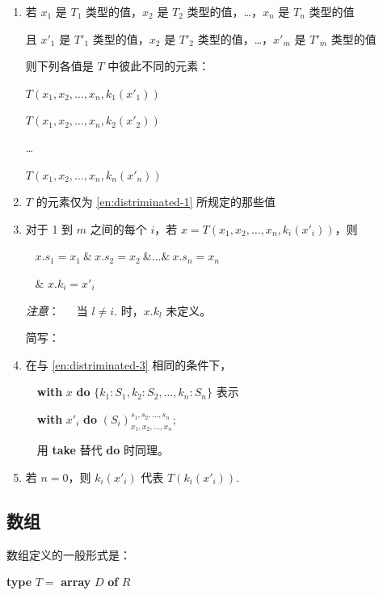 \begin{enumerate}[wide, nosep, label=(\arabic*)]
	\item \label{en:distriminated-1}
	若 $x_1$ 是 $T_1$ 类型的值，$x_2$ 是 $T_2$ 类型的值，\dots，$x_n$ 是 $T_n$ 类型的值
	
	且 $x'_1$ 是 $T'_1$ 类型的值，$x_2$ 是 $T'_2$ 类型的值，\dots，$x'_m$ 是 $T'_m$ 类型的值
	
	则下列各值是 $T$ 中彼此不同的元素：
	
	$T(x_1, x_2, \dots, x_n, k_1(x'_1))$
	
	$T(x_1, x_2, \dots, x_n, k_2(x'_2))$
	
	\quad \dots
	
	$T(x_1, x_2, \dots, x_n, k_n(x'_n))$

	\item $T$ 的元素仅为 \ref{en:distriminated-1} 所规定的那些值
	
	\item\label{en:distriminated-3}
	对于 1 到 $m$ 之间的每个 $i$，若 $x = T(x_1, x_2, \dots, x_n, k_i(x'_i))$，则
	
	\qquad~ $x.s_1 = x_1\ \&\ x.s_2 = x_2\ \& \dots \&\ x.s_n = x_n$
	
	\quad~ \& $x.k_i = x'_i$

	\noindent
	\textit{注意}：\quad~~\, 当 $l \neq i.$ 时，$x.k_l$ 未定义。
	
	\noindent
	简写：
	
	\item 在与 \ref{en:distriminated-3} 相同的条件下，
	
	\quad~\, \textbf{with} $x$ \textbf{do} $\{k_1:S_1, k_2:S_2, \dots, k_n:S_n\}$ 表示

	\quad~\, \textbf{with} $x'_i$ \textbf{do} $(S_i)_{x_1, x_2, \dots, x_n}^{s_1, s_2, \dots, s_n}$;

	\quad~\, 用 \textbf{take} 替代 \textbf{do} 时同理。

	\item 若 $n = 0$，则 $k_i(x'_i)$ 代表 $T(k_i(x'_i)).$
\end{enumerate}

\subsection{数组}

数组定义的一般形式是：

\quad \textbf{type} $T =$ \textbf{array} $D$ \textbf{of} $R$

